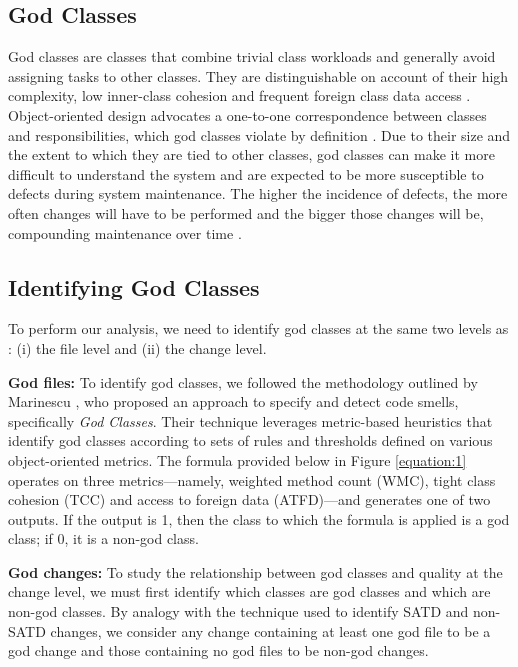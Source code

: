 \subsection{God Classes}
God classes are classes that combine trivial class workloads and generally avoid assigning tasks to other classes. They are distinguishable on account of their high complexity, low inner-class cohesion and frequent foreign class data access \cite{lanza2007object}. Object-oriented design advocates a one-to-one correspondence between classes and responsibilities, which god classes violate by definition \cite{lanza2007object}. Due to their size and the extent to which they are tied to other classes, god classes can make it more difficult to understand the system \cite{fowler1999refactoring} and are expected to be more susceptible to defects during system maintenance. The higher the incidence of defects, the more often changes will have to be performed and the bigger those changes will be, compounding maintenance over time \cite{fowler1999refactoring, lanza2007object}.

\subsection{Identifying God Classes}
\label{ch4_god}

To perform our analysis, we need to identify god classes at the same two levels as \SATD: (i) the file level and (ii) the change level.

\noindent\textbf{God files:} To identify god classes, we followed the methodology outlined by Marinescu \cite{marinescu2004detection}, who proposed an approach to specify and detect
code smells, specifically \textit{God Classes}. Their technique leverages metric-based heuristics that identify god classes according to sets of rules and thresholds defined on various object-oriented metrics. The formula provided below in Figure \ref{equation:1} operates on three metrics---namely, weighted method count (WMC), tight class cohesion (TCC) and access to foreign data (ATFD)---and generates one of two outputs. If the output is 1, then the class to which the formula is applied is a god class; if 0, it is a non-god class.

\noindent\textbf{God changes:}
To study the relationship between god classes and quality at the change level, we must first identify which classes are god classes and which are non-god classes. By analogy with the technique used to identify SATD and non-SATD changes, we consider any change containing at least one god file to be a god change and those containing no god files to be non-god changes. 


